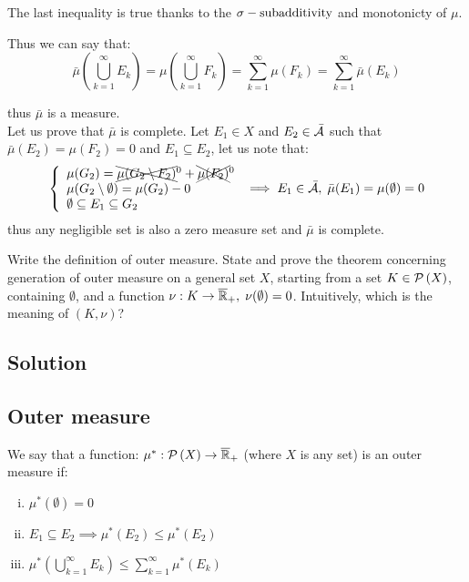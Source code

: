 \begin{itemize}
\begin{enumerate}[i)]
\begin{itemize}
            The last inequality is true thanks to the $\sigma-\text{subadditivity}$ and monotonicty of $\mu$.
        \end{itemize}
        Thus we can say that:
        \[
            \bar{\mu}\left( \bigcup_{k=1}^{\infty} E_k \right) = \mu \left( \bigcup_{k=1}^{\infty} F_k \right) = \sum_{k=1}^{\infty} \mu(F_k) = \sum_{k=1}^{\infty} \bar{\mu}(E_k)
        \]
    \end{enumerate}
    thus $\bar{\mu}$ is a measure.\\
    Let us prove that $\bar{\mu}$ is complete.
    Let $E_1 \in X$ and $E_2 \in \bar{\mathcal{A}}$ such that $\bar{\mu}(E_2)=\mu(F_2)=0$ and $E_1 \subseteq E_2$, let us note that:
    \[
        \left\{ \begin{array}{l}
            \mu(G_2) = \xcancel{\mu(G_2\setminus F_2)}^0+\xcancel{\mu(F_2)}^0\\
            \mu(G_2 \setminus \emptyset) = \mu(G_2) - 0\\
            \emptyset \subseteq E_1 \subseteq G_2 
        \end{array} \right. \implies E_1\in \bar{\mathcal{A}}, \; \bar{\mu}(E_1)=\mu(\emptyset) = 0
    \]
    thus any negligible set is also a zero measure set and $\bar{\mu}$ is complete.
\end{itemize}


\question
Write the definition of outer measure. State and prove the theorem concerning generation of
outer measure on a general set $X$, starting from a set $K \in\mathcal{P}\left(X\right)$, containing $\emptyset$, and a function
$\nu : K \to \overline{\mathbb{R}}_{+}, \; \nu(\emptyset) = 0$. Intuitively, which is the meaning of $(K, \nu)$?

\subsection*{Solution}

\subsection{Outer measure}\label{outer:def}
We say that a function: $\mu^*:\mathcal{P}\left(X\right)\to\overline{\mathbb{R}}_{+}$ (where $X$ is any set) is an outer measure if:
\begin{enumerate}[i)]
    \item $\mu^*(\emptyset)=0$
    \item \label{outer:mono}$E_1\subseteq E_2 \implies \mu^*(E_2) \leq \mu^*(E_2)$
    \item \label{outer:sub}$\mu^*\left( \bigcup_{k=1}^{\infty} E_k \right) \leq \sum_{k=1}^{\infty} \mu^*(E_k)$
\end{enumerate}

